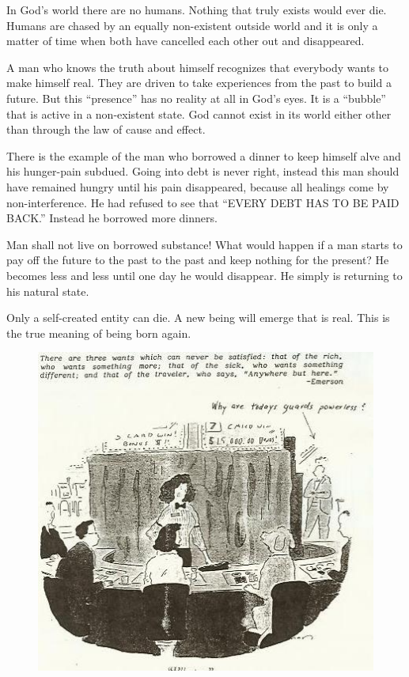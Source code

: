\documentclass[12pt,letterpaper]{article}
\begin{document}
In God's world there are no humans. Nothing that truly exists would
ever die. Humans are chased by an equally non-existent outside world
and it is only a matter of time when both have cancelled each other
out and disappeared.

A man who knows the truth about himself recognizes that everybody
wants to make himself real. They are driven to take experiences from
the past to build a future. But this ``presence'' has no reality at
all in God's eyes. It is a ``bubble'' that is active in a non-existent
state. God cannot exist in its world either other than through the law
of cause and effect.



There is the example of the man who borrowed a dinner to keep himself
alve and his hunger-pain subdued. Going into debt is never right,
instead this man should have remained hungry until his pain
disappeared, because all healings come by non-interference. He had
refused to see that ``EVERY DEBT HAS TO BE PAID BACK.'' Instead he
borrowed more dinners.

Man shall not live on borrowed substance! What would happen if a man
starts to pay off the future to the past to the past and keep nothing
for the present? He becomes less and less until one day he would
disappear. He simply is returning to his natural state.

Only a self-created entity can die. A new being will emerge that is
real. This is the true meaning of being born again.



\begin{figure} \centering
  \includegraphics[width=\textwidth]{p30.jpg}
\end{figure}
\end{document}
